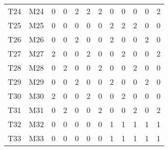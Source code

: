 \begin{table}[h]
\begin{tabular}{rrrrrrrrrrrr}
		T24 & M24 & 0 & 0 & 2 & 2 & 2 & 0 & 0 & 0 & 0 & 2 \\
		T25 & M25 & 0 & 0 & 0 & 0 & 0 & 2 & 2 & 2 & 0 & 0 \\
		T26 & M26 & 0 & 0 & 2 & 0 & 0 & 2 & 0 & 0 & 2 & 0 \\
		T27 & M27 & 2 & 0 & 0 & 2 & 0 & 0 & 2 & 0 & 0 & 2 \\
		T28 & M28 & 0 & 2 & 0 & 0 & 2 & 0 & 0 & 2 & 0 & 0 \\
		T29 & M29 & 0 & 0 & 2 & 0 & 0 & 2 & 0 & 0 & 2 & 0 \\
		T30 & M30 & 2 & 0 & 0 & 2 & 0 & 0 & 2 & 0 & 0 & 0 \\
		T31 & M31 & 0 & 2 & 0 & 0 & 2 & 0 & 0 & 2 & 0 & 2 \\
		T32 & M32 & 0 & 0 & 0 & 0 & 0 & 1 & 1 & 1 & 1 & 1 \\
		T33 & M33 & 0 & 0 & 0 & 0 & 0 & 1 & 1 & 1 & 1 & 1 \\
		\bottomrule
	\end{tabular}
\end{table}

